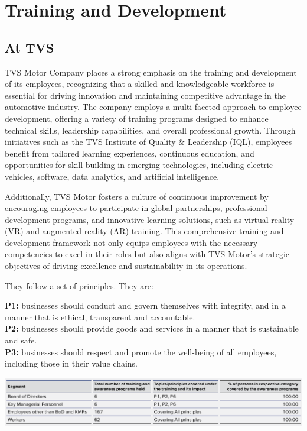 \section{Training and Development}

\subsection{At TVS}
TVS Motor Company places a strong emphasis on the training and development of its employees, recognizing that a skilled and knowledgeable workforce is essential for driving innovation and maintaining competitive advantage in the automotive industry. The company employs a multi-faceted approach to employee development, offering a variety of training programs designed to enhance technical skills, leadership capabilities, and overall professional growth. Through initiatives such as the TVS Institute of Quality \& Leadership (IQL), employees benefit from tailored learning experiences, continuous education, and opportunities for skill-building in emerging technologies, including electric vehicles, software, data analytics, and artificial intelligence.

Additionally, TVS Motor fosters a culture of continuous improvement by encouraging employees to participate in global partnerships, professional development programs, and innovative learning solutions, such as virtual reality (VR) and augmented reality (AR) training. This comprehensive training and development framework not only equips employees with the necessary competencies to excel in their roles but also aligns with TVS Motor's strategic objectives of driving excellence and sustainability in its operations.

They follow a set of principles\cite{tvsmotorMotorCompany}\cite{tvsmotorMotorCompanyMission}. They are:

\textbf{P1:} businesses should conduct and govern themselves with integrity, and in a manner that is ethical, transparent and accountable. \\\textbf{P2:} businesses should provide goods and services in a manner that is sustainable and safe. \\\textbf{P3:} businesses should respect and promote the well-being of all employees, including those in their value chains.

\includegraphics[width=\linewidth]{psycho_images/TVS_Training.png}

